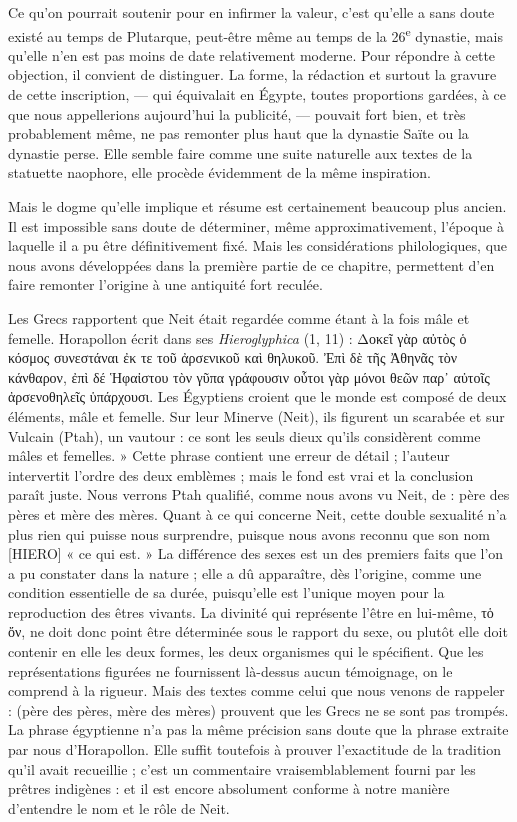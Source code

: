 \documentclass[a4paper, 11pt, oneside]{article}
\begin{document}
Ce qu'on pourrait soutenir pour en infirmer la valeur, c'est qu'elle a sans doute existé au temps de Plutarque, peut-être même au temps de la 26\textsuperscript{e} dynastie, mais qu'elle n'en est pas moins de date relativement moderne. Pour répondre à cette objection, il convient de distinguer. La forme, la rédaction et surtout la gravure de cette inscription, --- qui équivalait en Égypte, toutes proportions gardées, à ce que nous appellerions aujourd'hui la publicité, --- pouvait fort bien, et très probablement même, ne pas remonter plus haut que la dynastie Saïte ou la dynastie perse. Elle semble faire comme une suite naturelle aux textes de la statuette naophore, elle procède évidemment de la même inspiration.

Mais le dogme qu'elle implique et résume est certainement beaucoup plus ancien. Il est impossible sans doute de déterminer, même approximativement, l'époque à laquelle il a pu être définitivement fixé. Mais les considérations philologiques, que nous avons développées dans la première partie de ce chapitre, permettent d'en faire remonter l'origine à une antiquité fort reculée.

Les Grecs rapportent que Neit était regardée comme étant à la fois mâle et femelle. Horapollon écrit dans ses \emph{Hieroglyphica} (1, 11) : Δοκεῖ γὰρ αὐτὸς ὁ κόσμος συνεστάναι ἐκ τε τοῦ ἀρσενικοῦ καὶ θηλυκοῦ. Ἐπὶ δὲ τῆς Ἀθηνᾶς τὸν κάνθαρον, ἐπὶ δέ Ἡφαἰστου τὸν γῦπα γράφουσιν οὗτοι γὰρ μόνοι θεῶν παρ᾽ αὐτοῖς ἀρσενοθηλεῖς ὑπάρχουσι. Les Égyptiens croient que le monde est composé de deux éléments, mâle et femelle. Sur leur Minerve (Neit), ils figurent un scarabée et sur Vulcain (Ptah), un vautour : ce sont les seuls dieux qu'ils considèrent comme mâles et femelles. » Cette phrase contient une erreur de détail ; l'auteur intervertit l'ordre des deux emblèmes ; mais le fond est vrai et la conclusion paraît juste. Nous verrons Ptah qualifié, comme nous avons vu Neit, de : père des pères et mère des mères. Quant à ce qui concerne Neit, cette double sexualité n'a plus rien qui puisse nous surprendre, puisque nous avons reconnu que son nom [HIERO] « ce qui est. » La différence des sexes est un des premiers faits que l'on a pu constater dans la nature ; elle a dû apparaître, dès l'origine, comme une condition essentielle de sa durée, puisqu'elle est l'unique moyen pour la reproduction des êtres vivants. La divinité qui représente l'être en lui-même, τὁ ὄν, ne doit donc point être déterminée sous le rapport du sexe, ou plutôt elle doit contenir en elle les deux formes, les deux organismes qui le spécifient. Que les représentations figurées ne fournissent là-dessus aucun témoignage, on le comprend à la rigueur. Mais des textes comme celui que nous venons de rappeler : (père des pères, mère des mères) prouvent que les Grecs ne se sont pas trompés. La phrase égyptienne n'a pas la même précision sans doute que la phrase extraite par nous d'Horapollon. Elle suffit toutefois à prouver l'exactitude de la tradition qu'il avait recueillie ; c'est un commentaire vraisemblablement fourni par les prêtres indigènes : et il est encore absolument conforme à notre manière d'entendre le nom et le rôle de Neit.
\end{document}

